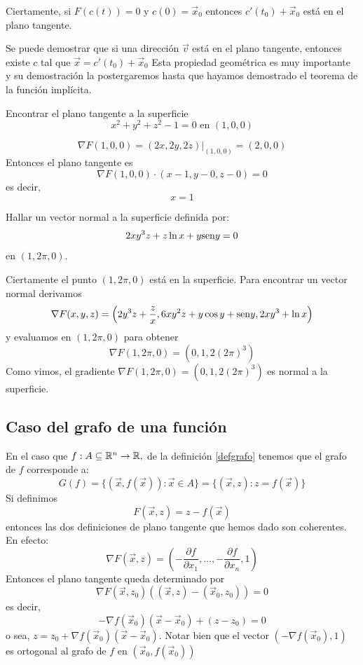 \begin{nota}
Ciertamente, si $ F(c(t))=0 $ y $ c(0)=\vec{x}_0 $ entonces $c'(t_0)+\vec{x}_0 $ est\'a en el plano tangente.
\end{nota}

Se puede demostrar que si una direcci\'on $ \vec{v} $ est\'a en el plano tangente,
entonces existe $ c $ tal que $ \vec{x}=c'(t_0)+\vec{x}_0 $
Esta propiedad geom\'etrica es muy importante y su demostraci\'on la
postergaremos hasta que hayamos demostrado el teorema de la
funci\'on impl\'icita.

\begin{ejemplo}
Encontrar el plano tangente a la superficie
\[ x^2+y^2+z^2-1=0 \text{ en } (1,0,0) \]
\begin{solucion} 
\[ \nabla F(1,0,0)=(2x,2y,2z)|_{(1,0,0)}=(2,0,0)\]
Entonces el plano tangente es
\[ \nabla F(1,0,0) \cdot (x-1,y-0,z-0)=0 \]
es decir,
\[  x=1  \]
\end{solucion}
\end{ejemplo}

\begin{ejemplo}
Hallar un vector normal a la superficie definida por:
\[ 2xy^3z+z\ln x+y\text{sen} y=0 \]
en $ (1,2\pi ,0) $. 

\begin{solucion}
Ciertamente el punto $ (1,2\pi ,0) $ est\'a en la superficie.
Para encontrar un vector normal derivamos
\[ \nabla F(x,y,z)=\left(2y^3z+\frac{z}{x},6xy^2z+y\cos y+\text{sen} y,2xy^3+\ln
x\right)\]
y evaluamos en $(1,2\pi ,0) $ para obtener
\[ \nabla F(1,2\pi ,0)=(0,1,2(2\pi)^3)\] 
Como vimos, el gradiente $\nabla F(1,2\pi ,0)=(0,1,2(2\pi)^3)$ es normal a la superficie.
\end{solucion}
\end{ejemplo}

\subsection{Caso del grafo de una funci\'on}
En el caso que $ f:A\subseteq \mathbb{R}^n\rightarrow \mathbb{R},$ de la definici\'on \ref{defgrafo} tenemos que el grafo  de $ f $ corresponde a: 
$$
 G (f) = \{ (\vec{x},f(\vec{x}))  : \vec{x} \in A \}  
  =  \{(\vec{x},z)  :  z=f(\vec{x}) \}
$$
Si definimos
\[ F(\vec{x},z)=z-f(\vec{x}) \]
entonces las dos definiciones de plano tangente que hemos dado
son coherentes. En
efecto:
\[ \nabla F(\vec{x},z)=\left(-\frac{\partial f}{\partial x_1},\ldots ,-\frac{\partial f}{\partial
x_n},1\right)\] 
Entonces el plano tangente queda determinado por
$$ \nabla F(\vec{x},z_0)((\vec{x},z)-(\vec{x}_0,z_0))=0$$
es decir,
\[ -\nabla f(\vec{x}_0)(\vec{x}-\vec{x}_0)+(z-z_0)=0 \]
o sea, $ z=z_0+\nabla f(\vec{x}_0)(\vec{x}-\vec{x}_0).$
Notar bien que el vector $ (-\nabla f(\vec{x}_0),1) $ es ortogonal al
grafo de $ f $ en $ (\vec{x}_0,f(\vec{x}_0)) $

